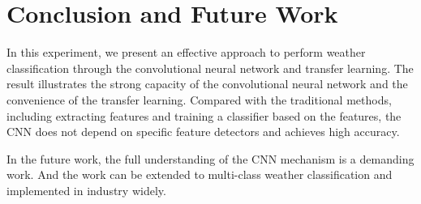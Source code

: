 \section{Conclusion and Future Work}

In this experiment, we present an effective approach to perform weather classification through the convolutional neural network and transfer learning. The result illustrates the strong capacity of the convolutional neural network and the convenience of the transfer learning. Compared with the traditional methods, including extracting features and training a classifier based on the features, the CNN does not depend on specific feature detectors and achieves high accuracy. 

In the future work, the full understanding of the CNN mechanism is a demanding work. And the work can be extended to multi-class weather classification and implemented in industry widely.